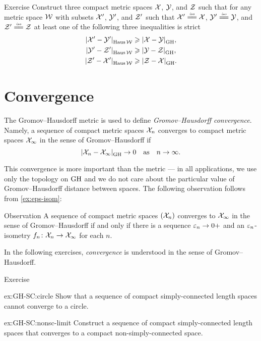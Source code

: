 \begin{thm}{Exercise}\label{ex:XYZ}
Construct three compact metric spaces $\mathcal{X}$, $\mathcal{Y}$, and $\mathcal{Z}$
such that for any metric space $\mathcal{W}$
with subsets $\mathcal{X}'$, $\mathcal{Y}'$, and $\mathcal{Z}'$ such that 
$\spc{X}'\iso\spc{X}$, $\spc{Y}'\iso\spc{Y}$, and $\spc{Z}'\iso\spc{Z}$
at least one of the following three inequalities is strict
\begin{align*}
\dist{\spc{X}'}{\spc{Y}'}{\Haus\spc{W}}&\ge \dist{\spc{X}}{\spc{Y}}{\GH},
\\
\dist{\spc{Y}'}{\spc{Z}'}{\Haus\spc{W}}&\ge\dist{\spc{Y}}{\spc{Z}}{\GH},
\\
\dist{\spc{Z}'}{\spc{X}'}{\Haus\spc{W}}&\ge\dist{\spc{Z}}{\spc{X}}{\GH}.
\end{align*}
\end{thm}

\section{Convergence}

The Gromov--Hausdorff metric is used to define \emph{Gromov--Hausdorff convergence}.
Namely, a sequence of compact metric spaces $\mathcal{X}_n$ converges to compact metric spaces $\mathcal{X}_\infty$ in the sense of Gromov--Hausdorff if 
\[\dist{\spc{X}_n}{\spc{X}_\infty}{\GH}\to 0\quad\text{as}\quad n\to\infty.\]

This convergence is more important than the metric ---
in all applications, we use only the topology on $\operatorname{\rm GH}\nolimits$
and we do not care about the particular value of Gromov--Hausdorff distance between spaces.
The following observation follows from \ref{ex:eps-isom}:

\begin{thm}{Observation}\label{obs:GH-e-isom}
A sequence of compact metric spaces $(\mathcal{X}_n)$ converges to  $\mathcal{X}_\infty$ in the sense of Gromov--Hausdorff if and only if there is a sequence $\varepsilon_n\to0+$
and an $\varepsilon_n$-isometry $f_n\colon\mathcal{X}_n\to \mathcal{X}_\infty$ for each $n$.
\end{thm}

In the following exercises, \textit{convergence} is understood in the sense of Gromov--Hausdorff.

\begin{thm}{Exercise}\label{ex:GH-SC}
\begin{subthm}{ex:GH-SC:circle}
Show that a sequence of compact simply-connected length spaces cannot converge to a circle.
\end{subthm}

\begin{subthm}{ex:GH-SC:nonsc-limit}
Construct a sequence of compact simply-connected length spaces that converges to a compact non-simply-connected space.
\end{subthm}
\end{thm}

